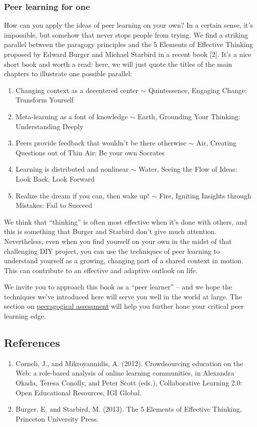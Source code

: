 \subsubsection{Peer learning for one}

How can you apply the ideas of peer learning on your own? In a certain
sense, it's impossible, but somehow that never stops people from trying.
We find a striking parallel between the paragogy principles and the 5
Elements of Effective Thinking proposed by Edward Burger and Michael
Starbird in a recent book {[}2{]}. It's a nice short book and worth a
read: here, we will just quote the titles of the main chapters to
illustrate one possible parallel:

\begin{enumerate}
\item
  Changing context as a decentered center \ensuremath{\sim}
  Quintessence, Engaging Change: Transform Yourself
\item
  Meta-learning as a font of knowledge \ensuremath{\sim} Earth,
  Grounding Your Thinking: Understanding Deeply
\item
  Peers provide feedback that wouldn't be there otherwise
  \ensuremath{\sim} Air, Creating Questions out of Thin Air: Be your own
  Socrates
\item
  Learning is distributed and nonlinear \ensuremath{\sim} Water, Seeing
  the Flow of Ideas: Look Back, Look Forward
\item
  Realize the dream if you can, then wake up! \ensuremath{\sim} Fire,
  Igniting Insights through Mistakes: Fail to Succeed
\end{enumerate}
We think that ``thinking'' is often most effective when it's done with
others, and this is something that Burger and Starbird don't give much
attention. Nevertheless, even when you find yourself on your own in the
midst of that challenging DIY project, you can use the techniques of
peer learning to understand yourself as a growing, changing part of a
shared context in motion. This can contribute to an effective and
adaptive outlook on life.

We invite you to approach this book as a ``peer learner'' -- and we hope
the techniques we've introduced here will serve you well in the world at
large. The section on
\href{http://peeragogy.org/assessment/}{peeragogical assessment} will
help you further hone your critical peer learning edge.

\subsection{References}

\begin{enumerate}
\item
  Corneli, J., and Mikroyannidis, A. (2012). Crowdsourcing education on
  the Web: a role-based analysis of online learning communities, in
  Alexandra Okada, Teresa Conolly, and Peter Scott (eds.), Collaborative
  Learning 2.0: Open Educational Resources, IGI Global.
\item
  Burger, E. and Starbird, M. (2013). The 5 Elements of Effective
  Thinking, Princeton University Press.
\end{enumerate}
